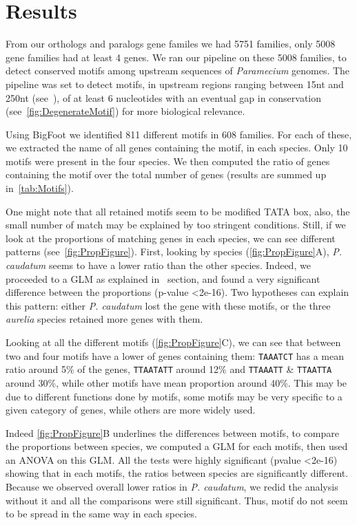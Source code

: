 \section*{Results}
\label{sec:Results}

From our orthologs and paralogs gene familes we had 5751 families, only 5008 gene families had at least 4 genes. We ran our pipeline on these 5008 families, to detect conserved motifs among upstream sequences of \textit{Paramecium} genomes. The pipeline was set to detect motifs, in upstream regions ranging between 15nt and 250nt (see~), of at least 6 nucleotides with an eventual gap in conservation (see~\autoref{fig:DegenerateMotif}) for more biological relevance.

Using BigFoot we identified 811 different motifs in 608 families. For each of these, we extracted the name of all genes containing the motif, in each species. Only 10 motifs were present in the four species. We then computed the ratio of genes containing the motif over the total number of genes (results are summed up in~\autoref{tab:Motifs}).

One might note that all retained motifs seem to be modified TATA box, also, the small number of match may be explained by too stringent conditions. Still, if we look at the proportions of matching genes in each species, we can see different patterns (see~\autoref{fig:PropFigure}). First, looking by species (\autoref{fig:PropFigure}A), \textit{P. caudatum} seems to have a lower ratio than the other species. Indeed, we proceeded to a GLM as explained in~ section, and found a very significant difference between the proportions (p-value \textless 2e-16). Two hypotheses can explain this pattern: either \textit{P. caudatum} lost the gene with these motifs, or the three \textit{aurelia} species retained more genes with them.

Looking at all the different motifs (\autoref{fig:PropFigure}C), we can see that between two and four motifs have a lower of genes containing them: \texttt{TAAATCT} has a mean ratio around 5\% of the genes, \texttt{TTAATATT} around 12\% and \texttt{TTAAATT} \& \texttt{TTAATTA} around 30\%, while other motifs have mean proportion around 40\%. This may be due to different functions done by motifs, some motifs may be very specific to a given category of genes, while others are more widely used.

Indeed \autoref{fig:PropFigure}B underlines the differences between motifs, to compare the proportions between species, we computed a GLM for each motifs, then used an ANOVA on this GLM. All the tests were highly significant (pvalue \textless 2e-16) showing that in each motifs, the ratios between species are significantly different. Because we observed overall lower ratios in \textit{P. caudatum}, we redid the analysis without it and all the comparisons were still significant. Thus, motif do not seem to be spread in the same way in each species.

